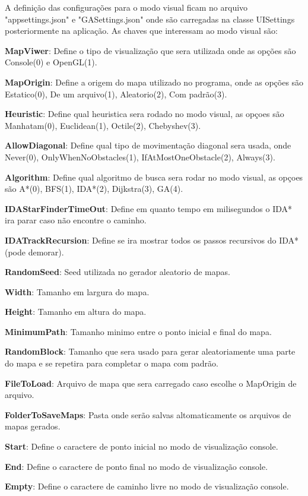 A definição das configurações para o modo visual ficam no arquivo "appsettings.json" e "GASettings.json" onde são carregadas na classe UISettings posteriormente na aplicação. As chaves que interessam ao modo visual são:


\textbf{MapViwer}: Define o tipo de visualização que sera utilizada onde as opções são Console(0) e OpenGL(1).

\textbf{MapOrigin}: Define a origem do mapa utilizado no programa, onde as opções são Estatico(0), De um arquivo(1), Aleatorio(2), Com padrão(3).

\textbf{Heuristic}: Define qual heuristica sera rodado no modo visual, as opçoes são Manhatam(0), Euclidean(1), Octile(2), Chebyshev(3).

\textbf{AllowDiagonal}: Define qual tipo de movimentação diagonal sera usada, onde Never(0), OnlyWhenNoObstacles(1), IfAtMostOneObstacle(2), Always(3).

\textbf{Algorithm}: Define qual algoritmo de busca sera rodar no modo visual, as opçoes são  A\**(0), BFS(1), IDA\**(2), Dijkstra(3), GA(4).
 
\textbf{IDAStarFinderTimeOut}: Define em quanto tempo em milisegundos o IDA\** ira parar caso não encontre o caminho.

\textbf{IDATrackRecursion}: Define se ira mostrar todos os passos recursivos do IDA\** (pode demorar).
 
\textbf{RandomSeed}: Seed utilizada no gerador aleatorio de mapas.

\textbf{Width}: Tamanho em largura do mapa.

\textbf{Height}: Tamanho em altura do mapa.

\textbf{MinimumPath}: Tamanho minimo entre o ponto inicial e final do mapa.

\textbf{RandomBlock}: Tamanho que sera usado para gerar aleatoriamente uma parte do mapa e se repetira para completar o mapa com padrão.

\textbf{FileToLoad}: Arquivo de mapa que sera carregado caso escolhe o MapOrigin de arquivo.

\textbf{FolderToSaveMaps}: Pasta onde serão salvas altomaticamente os arquivos de mapas gerados.

\textbf{Start}: Define o caractere de ponto inicial no modo de visualização console.

\textbf{End}: Define o caractere de ponto final no modo de visualização console.

\textbf{Empty}: Define o caractere de caminho livre no modo de visualização console.

